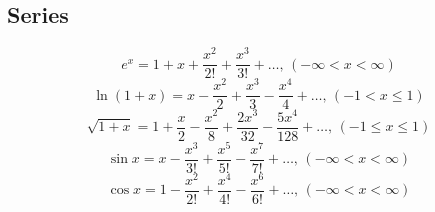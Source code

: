 \subsection{Series}
$$e^x = 1+x+\frac{x^2}{2!}+\frac{x^3}{3!}+\dots,\,(-\infty<x<\infty)$$
$$\ln(1+x) = x-\frac{x^2}{2}+\frac{x^3}{3}-\frac{x^4}{4}+\dots,\,(-1<x\leq1)$$
$$\sqrt{1+x} = 1+\frac{x}{2}-\frac{x^2}{8}+\frac{2x^3}{32}-\frac{5x^4}{128}+\dots,\,(-1\leq x\leq1)$$
$$\sin x = x-\frac{x^3}{3!}+\frac{x^5}{5!}-\frac{x^7}{7!}+\dots,\,(-\infty<x<\infty)$$
$$\cos x = 1-\frac{x^2}{2!}+\frac{x^4}{4!}-\frac{x^6}{6!}+\dots,\,(-\infty<x<\infty)$$

